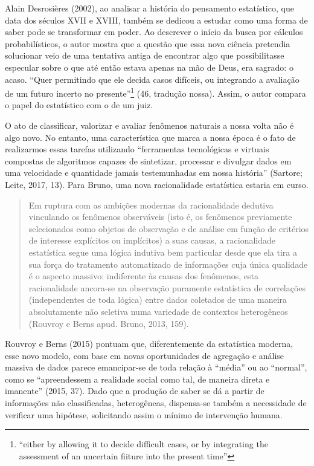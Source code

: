 Alain Desrosières
\protect\hypertarget{__Fieldmark__1290_1356454502}{}{}(\protect\hypertarget{__Fieldmark__390_193002426}{}{}2\protect\hypertarget{__Fieldmark__384_1743353457}{}{}0\protect\hypertarget{__Fieldmark__3251_70101425}{}{}0\protect\hypertarget{__Fieldmark__1252_1804063266}{}{}2),
ao analisar a história do pensamento estatístico, que data dos séculos
XVII e XVIII, também se dedicou a estudar como uma forma de saber pode
se transformar em poder. Ao descrever o início da busca por cálculos
probabilísticos, o autor mostra que a questão que essa nova ciência
pretendia solucionar veio de uma tentativa antiga de encontrar algo que
possibilitasse especular sobre o que até então estava apenas na mão de
Deus, era sagrado: o acaso. ``Quer permitindo que ele decida casos
difíceis, ou integrando a avaliação de um futuro incerto no
presente''\footnote{``either by allowing it to decide difficult cases,
  or by integrating the assessment of an uncertain fiiture into the
  present time''} (46, tradução nossa). Assim, o autor compara o papel
do estatístico com o de um juiz.

O ato de classificar, valorizar e avaliar fenômenos naturais a nossa
volta não é algo novo. No entanto, uma característica que marca a nossa
época é o fato de realizarmos essas tarefas utilizando ``ferramentas
tecnológicas e virtuais compostas de algoritmos capazes de sintetizar,
processar e divulgar dados em uma velocidade e quantidade jamais
testemunhadas em nossa história''
\protect\hypertarget{__Fieldmark__1326_1356454502}{}{}(Sartore; Leite,
2017, 13). Para Bruno, uma nova racionalidade estatística estaria em
curso.

\begin{quote}
Em ruptura com as ambições modernas da racionalidade dedutiva vinculando
os fenômenos observáveis (isto é, os fenômenos previamente selecionados
como objetos de observação e de análise em função de critérios de
interesse explícitos ou implícitos) a suas causas, a racionalidade
estatística segue uma lógica indutiva bem particular desde que ela tira
a sua força do tratamento automatizado de informações cuja única
qualidade é o aspecto massivo: indiferente às causas dos fenômenos, esta
racionalidade ancora-se na observação puramente estatística de
correlações (independentes de toda lógica) entre dados coletados de uma
maneira absolutamente não seletiva numa variedade de contextos
heterogêneos (Rouvroy e Berns apud. Bruno, 2013, 159).
\end{quote}

Rouvroy e Berns (2015) pontuam que, diferentemente da estatística
moderna, esse novo modelo, com base em novas oportunidades de agregação
e análise massiva de dados parece emancipar-se de toda relação à
``média'' ou ao ``normal'', como se ``apreendessem a realidade social
como tal, de maneira direta e imanente'' (2015, 37). Dado que a produção
de saber se dá a partir de informações não classificadas, heterogêneas,
dispensa-se também a necessidade de verificar uma hipótese, solicitando
assim o mínimo de intervenção humana.

